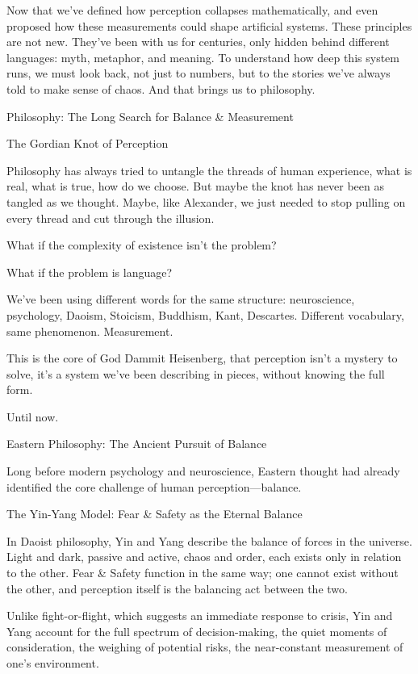 \documentclass[11pt]{article}
\begin{document}
Now that we’ve defined how perception collapses mathematically, and even proposed how these measurements could shape artificial systems. These principles are not new. They’ve been with us for centuries, only hidden behind different languages: myth, metaphor, and meaning. To understand how deep this system runs, we must look back, not just to numbers, but to the stories we’ve always told to make sense of chaos.
And that brings us to philosophy.

Philosophy: The Long Search for Balance & Measurement

The Gordian Knot of Perception

Philosophy has always tried to untangle the threads of human experience, what is real, what is true, how do we choose. But maybe the knot has never been as tangled as we thought. Maybe, like Alexander, we just needed to stop pulling on every thread and cut through the illusion.

What if the complexity of existence isn’t the problem?

What if the problem is language?

We’ve been using different words for the same structure: neuroscience, psychology, Daoism, Stoicism, Buddhism, Kant, Descartes. Different vocabulary, same phenomenon. Measurement.

This is the core of God Dammit Heisenberg, that perception isn’t a mystery to solve, it’s a system we’ve been describing in pieces, without knowing the full form.

Until now.

Eastern Philosophy: The Ancient Pursuit of Balance

Long before modern psychology and neuroscience, Eastern thought had already identified the core challenge of human perception—balance.

The Yin-Yang Model: Fear & Safety as the Eternal Balance

In Daoist philosophy, Yin and Yang describe the balance of forces in the universe. Light and dark, passive and active, chaos and order, each exists only in relation to the other. Fear & Safety function in the same way; one cannot exist without the other, and perception itself is the balancing act between the two.

Unlike fight-or-flight, which suggests an immediate response to crisis, Yin and Yang account for the full spectrum of decision-making, the quiet moments of consideration, the weighing of potential risks, the near-constant measurement of one's environment.
\end{document}
